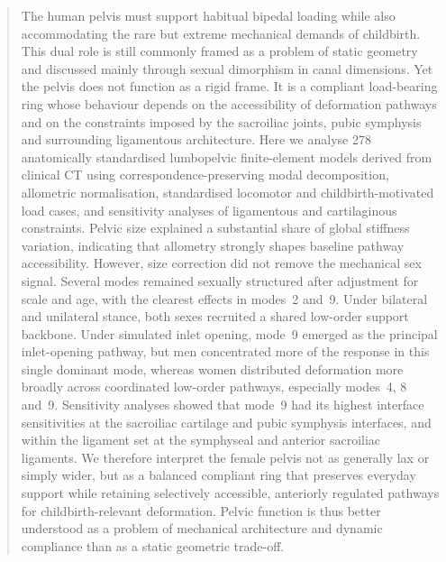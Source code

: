 \documentclass[openacc]{rsproca_new}
\begin{document}
\begin{abstract}
The human pelvis must support habitual bipedal loading while also accommodating the rare but extreme mechanical demands of childbirth. This dual role is still commonly framed as a problem of static geometry and discussed mainly through sexual dimorphism in canal dimensions. Yet the pelvis does not function as a rigid frame. It is a compliant load-bearing ring whose behaviour depends on the accessibility of deformation pathways and on the constraints imposed by the sacroiliac joints, pubic symphysis and surrounding ligamentous architecture. Here we analyse 278 anatomically standardised lumbopelvic finite-element models derived from clinical CT using correspondence-preserving modal decomposition, allometric normalisation, standardised locomotor and childbirth-motivated load cases, and sensitivity analyses of ligamentous and cartilaginous constraints. Pelvic size explained a substantial share of global stiffness variation, indicating that allometry strongly shapes baseline pathway accessibility. However, size correction did not remove the mechanical sex signal. Several modes remained sexually structured after adjustment for scale and age, with the clearest effects in modes~2 and~9. Under bilateral and unilateral stance, both sexes recruited a shared low-order support backbone. Under simulated inlet opening, mode~9 emerged as the principal inlet-opening pathway, but men concentrated more of the response in this single dominant mode, whereas women distributed deformation more broadly across coordinated low-order pathways, especially modes~4, 8 and~9. Sensitivity analyses showed that mode~9 had its highest interface sensitivities at the sacroiliac cartilage and pubic symphysis interfaces, and within the ligament set at the symphyseal and anterior sacroiliac ligaments. We therefore interpret the female pelvis not as generally lax or simply wider, but as a balanced compliant ring that preserves everyday support while retaining selectively accessible, anteriorly regulated pathways for childbirth-relevant deformation. Pelvic function is thus better understood as a problem of mechanical architecture and dynamic compliance than as a static geometric trade-off.
\end{abstract}

\maketitle
\end{document}
